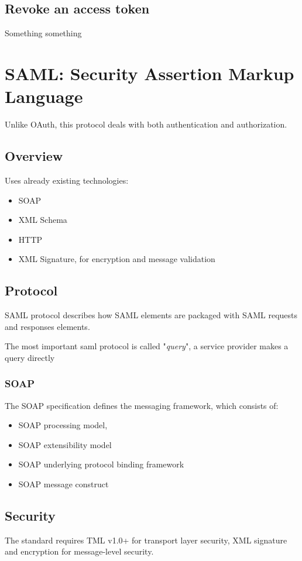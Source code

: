 \documentclass{style}
\begin{document}
\subsection{Revoke an access token}
Something something

\section{SAML: Security Assertion Markup Language}
Unlike OAuth, this protocol deals with both authentication and
authorization.

\subsection{Overview}
Uses already existing technologies:
\begin{itemize}
    \item SOAP
    \item XML Schema
    \item HTTP
    \item XML Signature, for encryption and message validation
\end{itemize}

\subsection{Protocol}
SAML protocol describes how SAML elements are packaged with SAML requests
and responses elements.

The most important saml protocol is called "\textit{query}", a service provider
makes a query directly
\subsubsection{SOAP}
The SOAP specification defines the messaging framework, which consists of:
\begin{itemize}
    \item SOAP processing model,
    \item SOAP extensibility model
    \item SOAP underlying protocol binding framework
    \item SOAP message construct
\end{itemize}

\subsection{Security}
The standard requires TML v1.0+ for transport layer security, XML signature
and encryption for message-level security.
\end{document}
